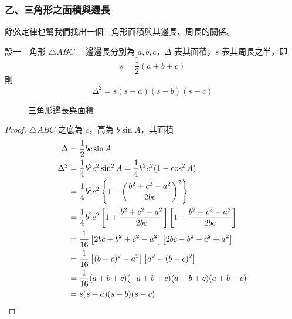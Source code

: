 \subsubsection*{乙、三角形之面積與邊長}

餘弦定律也幫我們找出一個三角形面積與其邊長、周長的關係。

\begin{theorem}
設一三角形 $\triangle ABC$ 三邊邊長分別為 $a, b, c$，$\Delta$ 表其面積，$s$ 表其周長之半，即
\[ s = \frac{1}{2}(a+b+c) \]
則
\begin{equation}
\Delta^2 = s(s-a)(s-b)(s-c) \label{eq:b3s-heron}
\end{equation}
\end{theorem}

\begin{figure}[H]
\centering
{}
\caption{三角形邊長與面積}
\label{fig:b3s-fig2-42}
\end{figure}

\begin{proof}
$\triangle ABC$ 之底為 $c$，高為 $b\sin A$，其面積
\begin{align*}
\Delta &= \frac{1}{2}bc\sin A \\
\Delta^2 &= \frac{1}{4}b^2 c^2 \sin^2 A = \frac{1}{4}b^2 c^2(1 - \cos^2 A) \\
&= \frac{1}{4}b^2 c^2\left\{1 - \left(\frac{b^2 + c^2 - a^2}{2bc}\right)^2\right\} \\
&= \frac{1}{4}b^2 c^2\left[1 + \frac{b^2 + c^2 - a^2}{2bc}\right]\left[1 - \frac{b^2 + c^2 - a^2}{2bc}\right] \\
&= \frac{1}{16}\left[2bc + b^2 + c^2 - a^2\right]\left[2bc - b^2 - c^2 + a^2\right] \\
&= \frac{1}{16}\left[(b+c)^2 - a^2\right]\left[a^2 - (b-c)^2\right] \\
&= \frac{1}{16}(a+b+c)(-a+b+c)(a-b+c)(a+b-c) \\
&= s(s-a)(s-b)(s-c) \qedhere
\end{align*}
\end{proof}

